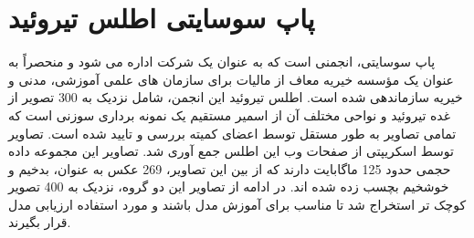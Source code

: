 \section{پاپ سوسایتی اطلس تیروئید}\label{subsec:پاپ-سوسایتی}
پاپ سوسایتی، انجمنی است که به عنوان یک شرکت اداره می شود و منحصراً به عنوان یک مؤسسه خیریه معاف از مالیات برای سازمان های علمی آموزشی، مدنی و خیریه سازماندهی شده است.
اطلس تیروئید این انجمن\cite{papsocietyiamgeatlas}، شامل نزدیک به 300 تصویر از غده تیروئید و نواحی مختلف آن از اسمیر مستقیم یک نمونه برداری سوزنی است که تمامی تصاویر به طور مستقل توسط اعضای کمیته بررسی و تایید شده است.
تصاویر توسط اسکریپتی از صفحات وب این اطلس جمع آوری شد. تصاویر این مجموعه داده حجمی حدود 125 ماگابایت دارند که از بین این تصاویر، 269 عکس به عنوان، بدخیم و خوشخیم بچسب زده شده اند. در ادامه از تصاویر این دو گروه، نزدیک به 400 تصویر کوچک تر استخراج شد تا مناسب برای آموزش مدل باشند و مورد استفاده ارزیابی مدل قرار بگیرند. 